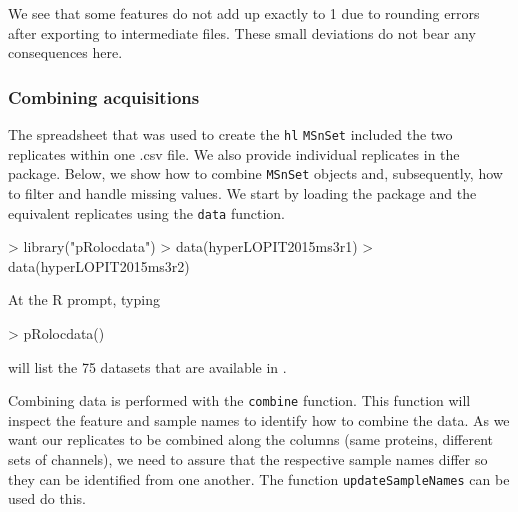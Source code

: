 We see that some features do not add up exactly to 1 due to rounding
errors after exporting to intermediate files. These small deviations
do not bear any consequences here.


\subsubsection*{Combining acquisitions}

The spreadsheet that was used to create the \texttt{hl}
\texttt{MSnSet} included the two replicates within one .csv file.  We
also provide individual replicates in the 
package. Below, we show how to combine \texttt{MSnSet} objects and,
subsequently, how to filter and handle missing values. We start by
loading the  package and the equivalent
replicates using the \texttt{data} function.

\begin{Schunk}
\begin{Sinput}
> library("pRolocdata")
> data(hyperLOPIT2015ms3r1)
> data(hyperLOPIT2015ms3r2)
\end{Sinput}
\end{Schunk}

At the R prompt, typing

\begin{Schunk}
\begin{Sinput}
> pRolocdata()
\end{Sinput}
\end{Schunk}

will list the 75 datasets that are
available in .


Combining data is performed with the \texttt{combine} function. This
function will inspect the feature and sample names to identify how to
combine the data. As we want our replicates to be combined along the
columns (same proteins, different sets of channels), we need to assure
that the respective sample names differ so they can be identified from
one another. The function \texttt{updateSampleNames} can be used do
this.

